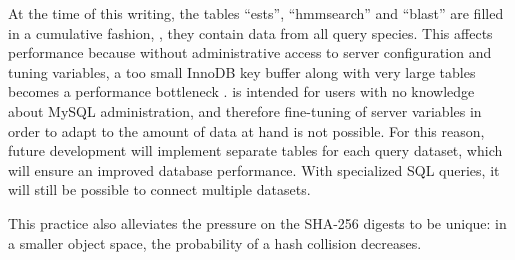 \label{sec:table-per-species}
At the time of this writing, the tables ``ests'', ``hmmsearch'' and ``blast''
are filled in a cumulative fashion, \ie, they contain data from all query
species. This affects performance because without administrative access to
server configuration and tuning variables, a too small InnoDB key buffer along
with very large tables becomes a performance bottleneck \citep{mysql2013}.
\pname is intended for users with no knowledge about MySQL administration, and
therefore fine-tuning of server variables in order to adapt to the amount of
data at hand is not possible. For this reason, future development will implement
separate tables for each query dataset, which will ensure an improved database
performance. With specialized SQL queries, it will still be possible to connect
multiple datasets.

This practice also alleviates the pressure on the SHA-256 digests to be unique:
in a smaller object space, the probability of a hash collision decreases.
